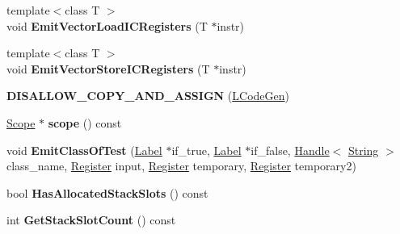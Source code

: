 \begin{DoxyCompactItemize}
\item 
{\footnotesize template$<$class T $>$ }\\void {\bfseries Emit\+Vector\+Load\+I\+C\+Registers} (T $\ast$instr)\hypertarget{classv8_1_1internal_1_1_l_code_gen_a31e396d22475d9c9dec1ac0e5030380a}{}\label{classv8_1_1internal_1_1_l_code_gen_a31e396d22475d9c9dec1ac0e5030380a}

\item 
{\footnotesize template$<$class T $>$ }\\void {\bfseries Emit\+Vector\+Store\+I\+C\+Registers} (T $\ast$instr)\hypertarget{classv8_1_1internal_1_1_l_code_gen_a84c9b0e87f89361233a5c74e43d689cb}{}\label{classv8_1_1internal_1_1_l_code_gen_a84c9b0e87f89361233a5c74e43d689cb}

\item 
{\bfseries D\+I\+S\+A\+L\+L\+O\+W\+\_\+\+C\+O\+P\+Y\+\_\+\+A\+N\+D\+\_\+\+A\+S\+S\+I\+GN} (\hyperlink{classv8_1_1internal_1_1_l_code_gen}{L\+Code\+Gen})\hypertarget{classv8_1_1internal_1_1_l_code_gen_a475eb7b3d7738263ae865905cf36b985}{}\label{classv8_1_1internal_1_1_l_code_gen_a475eb7b3d7738263ae865905cf36b985}

\item 
\hyperlink{classv8_1_1internal_1_1_scope}{Scope} $\ast$ {\bfseries scope} () const \hypertarget{classv8_1_1internal_1_1_l_code_gen_a2b85c964ccc4e59f50d49d19b0ed5ce0}{}\label{classv8_1_1internal_1_1_l_code_gen_a2b85c964ccc4e59f50d49d19b0ed5ce0}

\item 
void {\bfseries Emit\+Class\+Of\+Test} (\hyperlink{classv8_1_1internal_1_1_label}{Label} $\ast$if\+\_\+true, \hyperlink{classv8_1_1internal_1_1_label}{Label} $\ast$if\+\_\+false, \hyperlink{classv8_1_1internal_1_1_handle}{Handle}$<$ \hyperlink{classv8_1_1internal_1_1_string}{String} $>$ class\+\_\+name, \hyperlink{structv8_1_1internal_1_1_register}{Register} input, \hyperlink{structv8_1_1internal_1_1_register}{Register} temporary, \hyperlink{structv8_1_1internal_1_1_register}{Register} temporary2)\hypertarget{classv8_1_1internal_1_1_l_code_gen_aae86e9c7161b47dc83e86e0ef0402a43}{}\label{classv8_1_1internal_1_1_l_code_gen_aae86e9c7161b47dc83e86e0ef0402a43}

\item 
bool {\bfseries Has\+Allocated\+Stack\+Slots} () const \hypertarget{classv8_1_1internal_1_1_l_code_gen_a6a5091a94d97298722ad3509d6fa41ab}{}\label{classv8_1_1internal_1_1_l_code_gen_a6a5091a94d97298722ad3509d6fa41ab}

\item 
int {\bfseries Get\+Stack\+Slot\+Count} () const \hypertarget{classv8_1_1internal_1_1_l_code_gen_ae997141e779eee569145e6d5f4326745}{}\label{classv8_1_1internal_1_1_l_code_gen_ae997141e779eee569145e6d5f4326745}


\end{DoxyCompactItemize}
